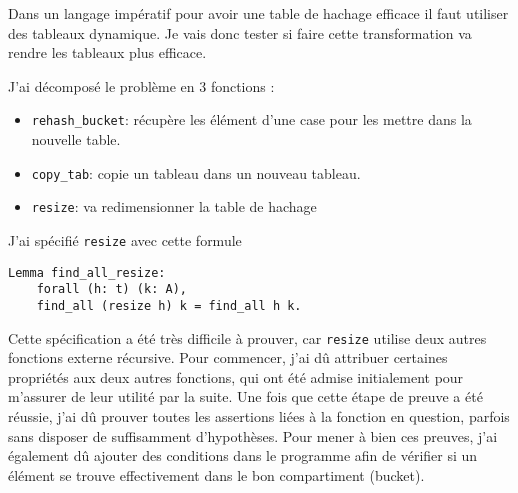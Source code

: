 \documentclass{article}
\begin{document}

  Dans un langage impératif pour avoir une table de hachage efficace il faut
utiliser des tableaux dynamique. Je vais donc tester si faire cette
transformation va rendre les tableaux plus efficace.

J'ai décomposé le problème en 3 fonctions :

\begin{itemize}
  \item \texttt{rehash\_bucket}: récupère les élément d'une case pour les mettre
    dans la nouvelle table.
  \item \texttt{copy\_tab}: copie un tableau dans un nouveau tableau.
  \item \texttt{resize}: va redimensionner la table de hachage
\end{itemize}

J'ai spécifié \texttt{resize} avec cette formule

\begin{lstlisting}[language=Coq]
  Lemma find_all_resize:
    forall (h: t) (k: A),
    find_all (resize h) k = find_all h k.
\end{lstlisting}

  Cette spécification a été très difficile à prouver, car \texttt{resize}
utilise deux autres fonctions externe récursive. Pour
commencer, j'ai dû attribuer certaines propriétés aux deux autres
fonctions, qui ont été admise initialement pour m'assurer de leur utilité
par la suite. Une fois que cette étape de preuve a été réussie, j'ai dû
prouver toutes les assertions liées à la fonction en question, parfois sans
disposer de suffisamment d'hypothèses. Pour mener à bien ces preuves, j'ai
également dû ajouter des conditions dans le programme afin de vérifier
si un élément se trouve effectivement dans le bon compartiment (bucket).
\end{document}
